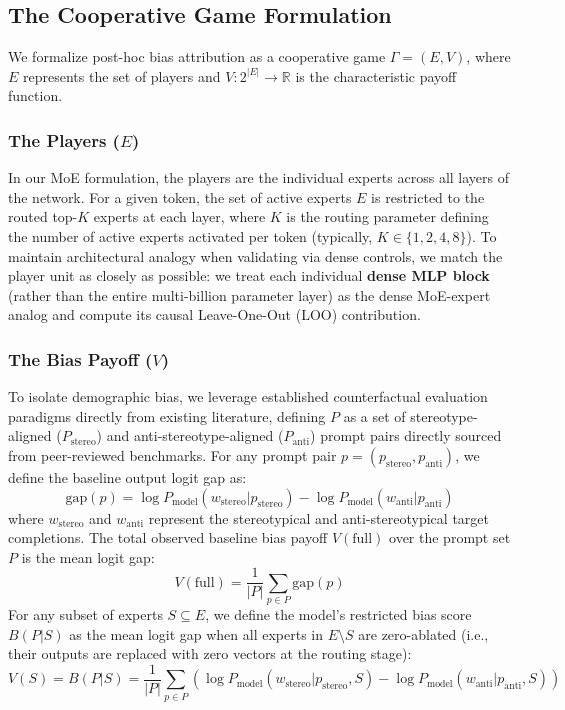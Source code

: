 \documentclass[11pt,a4paper]{article}
\begin{document}
\subsection{The Cooperative Game Formulation}
We formalize post-hoc bias attribution as a cooperative game $\Gamma = (E, V)$, where $E$ represents the set of players and $V: 2^{|E|} \to \mathbb{R}$ is the characteristic payoff function.

\subsubsection{The Players ($E$)}
In our MoE formulation, the players are the individual experts across all layers of the network. For a given token, the set of active experts $E$ is restricted to the routed top-$K$ experts at each layer, where $K$ is the routing parameter defining the number of active experts activated per token (typically, $K \in \{1, 2, 4, 8\}$). To maintain architectural analogy when validating via dense controls, we match the player unit as closely as possible: we treat each individual \textbf{dense MLP block} (rather than the entire multi-billion parameter layer) as the dense MoE-expert analog and compute its causal Leave-One-Out (LOO) contribution.

\subsubsection{The Bias Payoff ($V$)}
To isolate demographic bias, we leverage established counterfactual evaluation paradigms directly from existing literature, defining $P$ as a set of stereotype-aligned ($P_{\text{stereo}}$) and anti-stereotype-aligned ($P_{\text{anti}}$) prompt pairs directly sourced from peer-reviewed benchmarks. For any prompt pair $p = (p_{\text{stereo}}, p_{\text{anti}})$, we define the baseline output logit gap as:
$$\text{gap}(p) = \log P_{\text{model}}(w_{\text{stereo}} | p_{\text{stereo}}) - \log P_{\text{model}}(w_{\text{anti}} | p_{\text{anti}})$$
where $w_{\text{stereo}}$ and $w_{\text{anti}}$ represent the stereotypical and anti-stereotypical target completions. The total observed baseline bias payoff $V(\text{full})$ over the prompt set $P$ is the mean logit gap:
$$V(\text{full}) = \frac{1}{|P|} \sum_{p \in P} \text{gap}(p)$$
For any subset of experts $S \subseteq E$, we define the model's restricted bias score $B(P | S)$ as the mean logit gap when all experts in $E \setminus S$ are zero-ablated (i.e., their outputs are replaced with zero vectors at the routing stage):
$$V(S) = B(P | S) = \frac{1}{|P|} \sum_{p \in P} \left( \log P_{\text{model}}(w_{\text{stereo}} | p_{\text{stereo}}, S) - \log P_{\text{model}}(w_{\text{anti}} | p_{\text{anti}}, S) \right)$$
\end{document}
